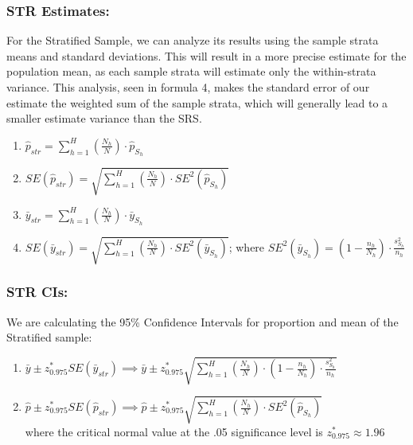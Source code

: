 \documentclass[paper=a4, fontsize=12pt,twoside]{article}	%
\begin{document}
\subsubsection{STR Estimates:}
For the Stratified Sample, we can analyze its results using the sample strata means and standard deviations.  This will result in a more precise estimate for the population mean, as each sample strata will estimate only the within-strata variance.  This analysis, seen in formula 4, makes the standard error of our estimate the weighted sum of the sample strata, which will generally lead to a smaller estimate variance than the SRS.
\begin{enumerate}
    \item $\hat{p}_{str}=\sum\limits_{h=1}^{H}(\frac{N_h}{N})\cdot \hat{p}_{S_h}$
    \item $SE(\hat{p}_{str})=\sqrt{\sum\limits_{h=1}^{H}(\frac{N_h}{N}) \cdot SE^2{(\hat{p}_{S_h})}}$
    \item $\bar{y}_{str}=\sum\limits_{h=1}^{H}(\frac{N_h}{N})\cdot \bar{y}_{S_h}$
    \item $SE(\bar{y}_{str})=\sqrt{\sum\limits_{h=1}^{H}(\frac{N_h}{N}) \cdot SE^2{(\bar{y}_{S_h})}}$; where $SE^2(\bar{y}_{S_h})=(1-\frac{n_h}{N_h})\cdot \frac{s^2_{S_h}}{n_h}$
\end{enumerate}


\subsubsection{STR CIs:}
We are calculating the 95\% Confidence Intervals for proportion and mean of the Stratified sample:
\begin{enumerate}

\item $\bar{y}\pm z^*_{0.975}SE(\bar{y}_{str}) \implies \bar{y}\pm z^*_{0.975}\sqrt{\sum\limits_{h=1}^{H}(\frac{N_h}{N}) \cdot (1-\frac{n_h}{N_h})\cdot \frac{s^2_{S_h}}{n_h}}$
\item $\hat{p}\pm z^*_{0.975}SE(\hat{p}_{str}) \implies \hat{p}\pm z^*_{0.975}\sqrt{\sum\limits_{h=1}^{H}(\frac{N_h}{N}) \cdot SE^2{(\hat{p}_{S_h})}}$\\

where the critical normal value at the .05 significance level is $z^*_{0.975} \approx 1.96$
\end{enumerate}
\end{document}
